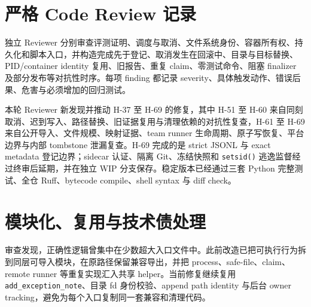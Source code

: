 \documentclass[11pt,a4paper,fontset=fandol]{ctexart}
\newcommand{\code}[1]{\texttt{#1}}
\begin{document}
\section{严格 Code Review 记录}

独立 Reviewer 分别审查评测证明、调度与取消、文件系统身份、容器所有权、持久化和脚本入口，并构造完成先于登记、取消发生在回滚中、目录与目标替换、PID/container identity 复用、旧报告、重复 claim、零测试命令、阻塞 finalizer 及部分发布等对抗性时序。每项 finding 都记录 severity、具体触发动作、错误后果、危害与必须增加的回归测试。

本轮 Reviewer 新发现并推动 H-37 至 H-69 的修复，其中 H-51 至 H-60 来自同刻取消、迟到写入、路径替换、旧证据复用与清理依赖的对抗性复查，H-61 至 H-69 来自公开导入、文件规模、映射证据、team runner 生命周期、原子写恢复、平台边界与内部 tombstone 泄漏复查。H-69 完成的是 strict JSONL 与 exact metadata 登记边界；sidecar 认证、隔离 Git、冻结快照和 \code{setsid()} 逃逸监督经过终审后延期，并在独立 WIP 分支保存。稳定版本已经通过三套 Python 完整测试、全仓 Ruff、bytecode compile、shell syntax 与 diff check。

\section{模块化、复用与技术债处理}

审查发现，正确性逻辑曾集中在少数超大入口文件中。此前改造已把可执行行为拆到同层可导入模块，在原路径保留兼容导出，并把 process、safe-file、claim、remote runner 等重复实现汇入共享 helper。当前修复继续复用 \code{add\_exception\_note}、目录 fd 身份校验、append path identity 与后台 owner tracking，避免为每个入口复制同一套兼容和清理代码。
\end{document}
